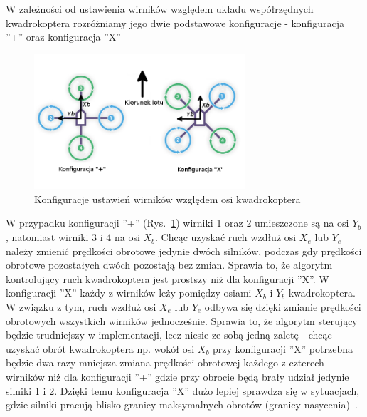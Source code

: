 W zależności od ustawienia wirników względem układu współrzędnych kwadrokoptera rozróżniamy jego dwie podstawowe konfiguracje - konfiguracja ''+''  oraz konfiguracja ''X''~\cite{quadro10, quadro11}

\begin{figure}[htbp]
	\centering
		\includegraphics[width=0.7\textwidth]{Pictures/quadrotor_configurations.png}
	\caption[Konfiguracje kwadrokopterów]{Konfiguracje ustawień wirników względem osi kwadrokoptera}
	\label{fig:quadrotor_configurations.png}
\end{figure}

W przypadku konfiguracji ''+'' (Rys.~\ref{fig:quadrotor_configurations.png}) wirniki 1 oraz 2 umieszczone są na osi $Y_b$, natomiast wirniki 3 i 4 na osi $X_b $. Chcąc uzyskać ruch wzdłuż osi $X_e$ lub $Y_e$ należy zmienić prędkości obrotowe jedynie dwóch silników, podczas gdy prędkości obrotowe pozostałych dwóch pozostają bez zmian. Sprawia to, że algorytm kontrolujący ruch kwadrokoptera jest prostszy niż dla konfiguracji ''X''. W konfiguracji ''X'' każdy z wirników leży pomiędzy osiami $X_b$ i $Y_b$ kwadrokoptera. W związku z tym, ruch wzdłuż osi $X_e$ lub $Y_e$ odbywa się dzięki zmianie prędkości obrotowych wszystkich wirników jednocześnie. Sprawia to, że algorytm sterujący będzie trudniejszy w implementacji, lecz niesie ze sobą jedną zaletę - chcąc uzyskać obrót kwadrokoptera np. wokół osi $X_b$ przy konfiguracji ''X'' potrzebna będzie dwa razy mniejsza zmiana prędkości obrotowej każdego z czterech wirników niż dla konfiguracji ''+'' gdzie przy obrocie będą brały udział jedynie silniki 1 i 2. Dzięki temu konfiguracja ''X'' dużo lepiej sprawdza się w sytuacjach, gdzie silniki pracują blisko granicy maksymalnych obrotów (granicy nasycenia)~\cite{quadro11}.

